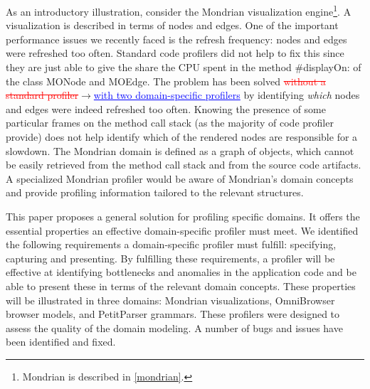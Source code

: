 \documentclass[runningheads]{llncs}
\newcommand{\ra}{$\rightarrow$}
\newcommand{\ugh}[1]{\textcolor{red}{\uwave{#1}}} %
\newcommand{\chg}[2]{\textcolor{red}{\sout{#1}}{\ra}\textcolor{blue}{\uline{#2}}} %
\newcommand{\lr}[1]{\nb{Lukas}{orange}{#1}}
\newcommand{\jr}[1]{\nb{Jorge}{cyan}{#1}}
\newcommand{\on}[1]{\nb{Oscar}{olive}{#1}}
\newcommand{\co}[1]{{\sf #1}}
\begin{document}

As an introductory illustration, consider the Mondrian visualization engine\footnote{Mondrian is described in \autoref{mondrian}.}. A visualization is described in terms of nodes and edges. One of the important performance issues we recently faced is the refresh frequency: nodes and edges were refreshed too often.
Standard code profilers did not help to fix this since they are just able to give the share the CPU spent in the method \co{\#displayOn:} of the class \co{MONode} and \co{MOEdge}. The problem has been solved \chg{without a standard profiler}{with two domain-specific profilers} by identifying \emph{which} nodes and edges were indeed refreshed too often. Knowing the presence of some particular frames on the method call stack (as the majority of code profiler provide) does not help identify which of the rendered nodes are responsible for a slowdown. The Mondrian domain is defined as a graph of objects, which cannot be easily retrieved from the method call stack and from the source code artifacts. A specialized Mondrian profiler would be aware of Mondrian's domain concepts and provide profiling information tailored to the relevant structures.


This paper proposes a general solution for profiling specific domains. It offers the essential properties an effective domain-specific profiler must meet. 
We identified the following requirements a domain-specific profiler must fulfill: specifying, capturing and presenting. \jr{check on comment}
By fulfilling these requirements, a profiler will be effective at identifying bottlenecks and anomalies in the application code and be able to present these in terms of the relevant domain concepts.
\on{?}
These properties will be illustrated in three domains: Mondrian visualizations, OmniBrowser browser models, and PetitParser grammars. These profilers were designed to assess the quality of the domain modeling. A number of bugs and issues have been identified and fixed.
\end{document}
